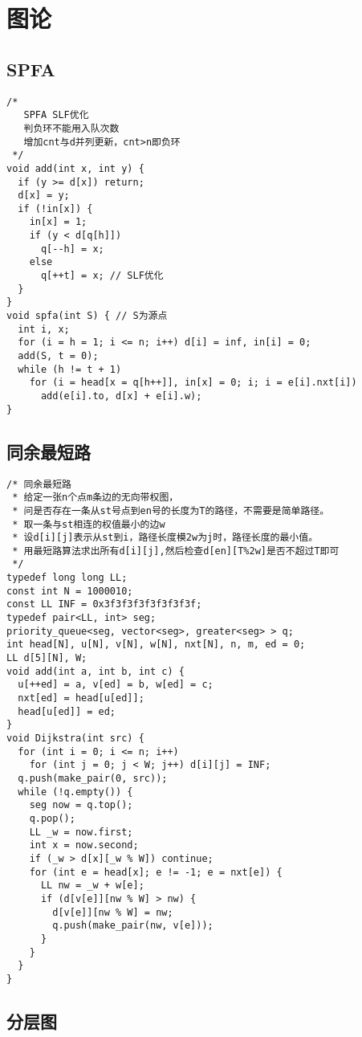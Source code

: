 \chapter{图论}

\section{SPFA}

\begin{lstlisting}
/*
   SPFA SLF优化
   判负环不能用入队次数
   增加cnt与d并列更新，cnt>n即负环
 */
void add(int x, int y) {
  if (y >= d[x]) return;
  d[x] = y;
  if (!in[x]) {
    in[x] = 1;
    if (y < d[q[h]])
      q[--h] = x;
    else
      q[++t] = x; // SLF优化
  }
}
void spfa(int S) { // S为源点
  int i, x;
  for (i = h = 1; i <= n; i++) d[i] = inf, in[i] = 0;
  add(S, t = 0);
  while (h != t + 1)
    for (i = head[x = q[h++]], in[x] = 0; i; i = e[i].nxt[i])
      add(e[i].to, d[x] + e[i].w);
}
\end{lstlisting}

\section{同余最短路}

\begin{lstlisting}
/* 同余最短路
 * 给定一张n个点m条边的无向带权图，
 * 问是否存在一条从st号点到en号的长度为T的路径，不需要是简单路径。
 * 取一条与st相连的权值最小的边w
 * 设d[i][j]表示从st到i，路径长度模2w为j时，路径长度的最小值。
 * 用最短路算法求出所有d[i][j],然后检查d[en][T%2w]是否不超过T即可
 */
typedef long long LL;
const int N = 1000010;
const LL INF = 0x3f3f3f3f3f3f3f3f;
typedef pair<LL, int> seg;
priority_queue<seg, vector<seg>, greater<seg> > q;
int head[N], u[N], v[N], w[N], nxt[N], n, m, ed = 0;
LL d[5][N], W;
void add(int a, int b, int c) {
  u[++ed] = a, v[ed] = b, w[ed] = c;
  nxt[ed] = head[u[ed]];
  head[u[ed]] = ed;
}
void Dijkstra(int src) {
  for (int i = 0; i <= n; i++)
    for (int j = 0; j < W; j++) d[i][j] = INF;
  q.push(make_pair(0, src));
  while (!q.empty()) {
    seg now = q.top();
    q.pop();
    LL _w = now.first;
    int x = now.second;
    if (_w > d[x][_w % W]) continue;
    for (int e = head[x]; e != -1; e = nxt[e]) {
      LL nw = _w + w[e];
      if (d[v[e]][nw % W] > nw) {
        d[v[e]][nw % W] = nw;
        q.push(make_pair(nw, v[e]));
      }
    }
  }
}
\end{lstlisting}

\section{分层图}

